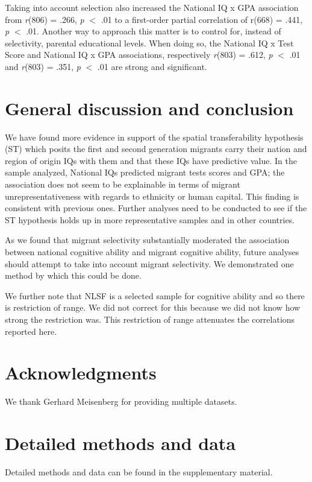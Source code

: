 \documentclass[a4paper,12pt]{article}
\begin{document}
Taking into account selection also increased the National IQ x GPA association from  \textit{r}(806) = .266, \textit{p} $ < $ .01 to a first-order partial correlation of r(668) = .441, \textit{p} $ < $ .01.  Another way to approach this matter is to control for, instead of selectivity, parental educational levels.  When doing so, the National IQ x Test Score and National IQ x GPA associations, respectively \textit{r}(803) = .612, \textit{p} $ < $ .01 and \textit{r}(803) = .351, \textit{p} $ < $ .01 are strong and significant.

\section{General discussion and conclusion}
We have found more evidence in support of the spatial transferability hypothesis (ST) which posits the first and second generation migrants carry their nation and region of origin IQs with them and that these IQs have predictive value.  In the sample analyzed, National IQs predicted migrant tests scores and GPA; the association does not seem to be explainable in terms of migrant unrepresentativeness with regards to ethnicity or human capital. This finding is consistent with previous ones. Further analyses need to be conducted to see if the ST hypothesis holds up in more representative samples and in other countries.

As we found that migrant selectivity substantially moderated the association between national cognitive ability and migrant cognitive ability, future analyses should attempt to take into account migrant selectivity. We demonstrated one method by which this could be done.

We further note that NLSF is a selected sample for cognitive ability and so there is restriction of range. We did not correct for this because we did not know how strong the restriction was. This restriction of range attenuates the correlations reported here.

\section{Acknowledgments}
We thank Gerhard Meisenberg for providing multiple datasets.

\section{Detailed methods and data}
Detailed methods and data can be found in the supplementary material.


\end{document}
